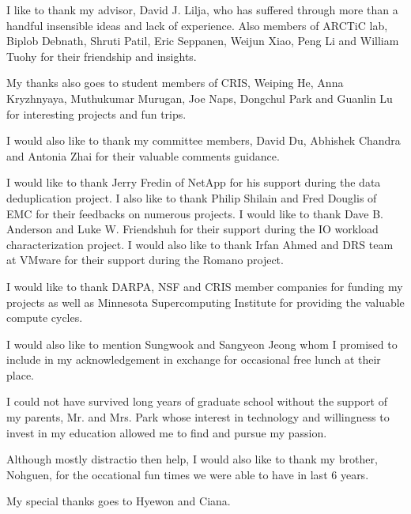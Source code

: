 
I like to thank my advisor, David J. Lilja, who has suffered through more than a handful insensible ideas and lack of experience. Also members of ARCTiC lab, Biplob Debnath, Shruti Patil, Eric Seppanen, Weijun Xiao, Peng Li and William Tuohy for their friendship and insights. 

My thanks also goes to student members of CRIS, Weiping He, Anna Kryzhnyaya, Muthukumar Murugan, Joe Naps, Dongchul Park and Guanlin Lu for interesting projects and fun trips. 

I would also like to thank my committee members, David Du, Abhishek Chandra and Antonia Zhai for their valuable comments guidance. 
 
I would like to thank Jerry Fredin of NetApp for his support during the data deduplication project. 
I also like to thank Philip Shilain and Fred Douglis of EMC for their feedbacks on numerous projects. 
I would like to thank Dave B. Anderson and Luke W. Friendshuh for their support during the IO workload characterization project.
I would also like to thank Irfan Ahmed and DRS team at VMware for their support during the Romano project. 

I would like to thank DARPA, NSF and CRIS member companies for funding my projects as well as Minnesota Supercomputing Institute for providing the valuable compute cycles. 

I would also like to mention Sungwook and Sangyeon Jeong whom I promised to include in my acknowledgement in exchange for occasional free lunch at their place. 

I could not have survived long years of graduate school without the support of my parents, Mr. and Mrs. Park whose interest in technology and willingness to invest in my education allowed me to find and pursue my passion. 

Although mostly distractio then help, I would also like to thank my brother, Nohguen, for the occational fun times we were able to have in last 6 years. 

My special thanks goes to Hyewon and Ciana. 

